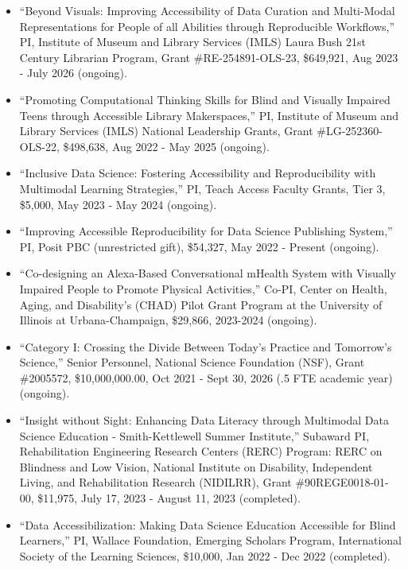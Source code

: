 \documentclass[11pt,a4paper,]{awesome-cv}
\begin{document}
\begin{itemize}
  \item
        ``Beyond Visuals: Improving Accessibility of Data Curation and
        Multi-Modal Representations for People of all Abilities through
        Reproducible Workflows,'' PI, Institute of Museum and Library Services
        (IMLS) Laura Bush 21st Century Librarian Program, Grant
        \#RE-254891-OLS-23, \$649,921, Aug 2023 - July 2026 (ongoing).
  \item
        ``Promoting Computational Thinking Skills for Blind and Visually
        Impaired Teens through Accessible Library Makerspaces,'' PI, Institute
        of Museum and Library Services (IMLS) National Leadership Grants,
        Grant \#LG-252360-OLS-22, \$498,638, Aug 2022 - May 2025 (ongoing).
  \item
        ``Inclusive Data Science: Fostering Accessibility and Reproducibility
        with Multimodal Learning Strategies,'' PI, Teach Access Faculty
        Grants, Tier 3, \$5,000, May 2023 - May 2024 (ongoing).
  \item
        ``Improving Accessible Reproducibility for Data Science Publishing
        System,'' PI, Posit PBC (unrestricted gift), \$54,327, May 2022 -
        Present (ongoing).
  \item
        ``Co-designing an Alexa-Based Conversational mHealth System with
        Visually Impaired People to Promote Physical Activities,'' Co-PI,
        Center on Health, Aging, and Disability's (CHAD) Pilot Grant Program
        at the University of Illinois at Urbana-Champaign, \$29,866, 2023-2024
        (ongoing).
  \item
        ``Category I: Crossing the Divide Between Today's Practice and
        Tomorrow's Science,'' Senior Personnel, National Science Foundation
        (NSF), Grant \#2005572, \$10,000,000.00, Oct 2021 - Sept 30, 2026 (.5
        FTE academic year) (ongoing).
  \item
        ``Insight without Sight: Enhancing Data Literacy through Multimodal
        Data Science Education - Smith-Kettlewell Summer Institute,'' Subaward
        PI, Rehabilitation Engineering Research Centers (RERC) Program: RERC
        on Blindness and Low Vision, National Institute on Disability,
        Independent Living, and Rehabilitation Research (NIDILRR), Grant
        \#90REGE0018-01-00, \$11,975, July 17, 2023 - August 11, 2023
        (completed).
  \item
        ``Data Accessibilization: Making Data Science Education Accessible for
        Blind Learners,'' PI, Wallace Foundation, Emerging Scholars Program,
        International Society of the Learning Sciences, \$10,000, Jan 2022 -
        Dec 2022 (completed).
\end{itemize}
\end{document}
